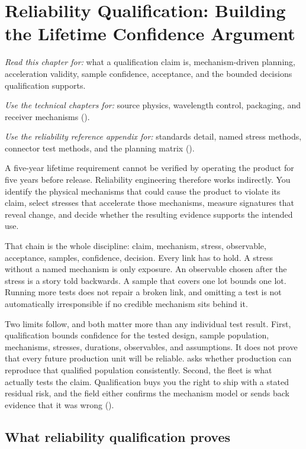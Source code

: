 \chapter{Reliability Qualification: Building the Lifetime Confidence Argument}
\label{ch:reliability}

\textit{Read this chapter for:} what a qualification claim is, mechanism-driven
planning, acceleration validity, sample confidence, acceptance, and the bounded
decisions qualification supports.

\textit{Use the technical chapters for:} source physics, wavelength control,
packaging, and receiver mechanisms
().

\textit{Use the reliability reference appendix for:} standards detail, named
stress methods, connector test methods, and the planning matrix
().

A five-year lifetime requirement cannot be verified by operating the product
for five years before release. Reliability engineering therefore works
indirectly. You identify the physical mechanisms that could cause the product
to violate its claim, select stresses that accelerate those mechanisms, measure
signatures that reveal change, and decide whether the resulting evidence
supports the intended use.

That chain is the whole discipline: claim, mechanism, stress, observable,
acceptance, samples, confidence, decision. Every link has to hold. A stress
without a named mechanism is only exposure. An observable chosen after the
stress is a story told backwards. A sample that covers one lot bounds one lot.
Running more tests does not repair a broken link, and omitting a test is not
automatically irresponsible if no credible mechanism sits behind it.

Two limits follow, and both matter more than any individual test result. First,
qualification bounds confidence for the tested design, sample population,
mechanisms, stresses, durations, observables, and assumptions. It does not
prove that every future production unit will be reliable.
 asks whether production can reproduce that qualified
population consistently. Second, the fleet is what actually tests the claim.
Qualification buys you the right to ship with a stated residual risk, and the
field either confirms the mechanism model or sends back evidence that it was
wrong ().

\section{What reliability qualification proves}
\label{sec:qual-terms}

